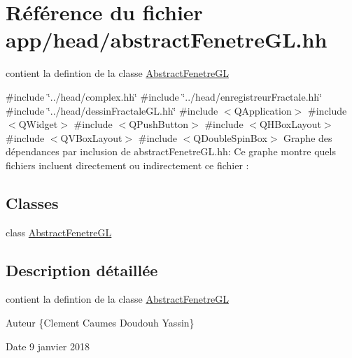 \hypertarget{abstractFenetreGL_8hh}{}\section{Référence du fichier app/head/abstract\+Fenetre\+GL.hh}
\label{abstractFenetreGL_8hh}


contient la defintion de la classe \hyperlink{classAbstractFenetreGL}{Abstract\+Fenetre\+GL}  


{\ttfamily \#include \char`\"{}../head/complex.\+hh\char`\"{}}\newline
{\ttfamily \#include \char`\"{}../head/enregistreur\+Fractale.\+hh\char`\"{}}\newline
{\ttfamily \#include \char`\"{}../head/dessin\+Fractale\+G\+L.\+hh\char`\"{}}\newline
{\ttfamily \#include $<$Q\+Application$>$}\newline
{\ttfamily \#include $<$Q\+Widget$>$}\newline
{\ttfamily \#include $<$Q\+Push\+Button$>$}\newline
{\ttfamily \#include $<$Q\+H\+Box\+Layout$>$}\newline
{\ttfamily \#include $<$Q\+V\+Box\+Layout$>$}\newline
{\ttfamily \#include $<$Q\+Double\+Spin\+Box$>$}\newline
Graphe des dépendances par inclusion de abstract\+Fenetre\+G\+L.\+hh\+:
Ce graphe montre quels fichiers incluent directement ou indirectement ce fichier \+:
\subsection*{Classes}
\begin{DoxyCompactItemize}
\item 
class \hyperlink{classAbstractFenetreGL}{Abstract\+Fenetre\+GL}
\end{DoxyCompactItemize}


\subsection{Description détaillée}
contient la defintion de la classe \hyperlink{classAbstractFenetreGL}{Abstract\+Fenetre\+GL} 

\begin{DoxyAuthor}{Auteur}
\{Clement Caumes Doudouh Yassin\} 
\end{DoxyAuthor}
\begin{DoxyDate}{Date}
9 janvier 2018 
\end{DoxyDate}
